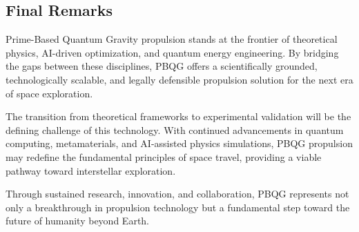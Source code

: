\documentclass{article}
\theoremstyle{plain}
\begin{document}
\subsection{Final Remarks}
\label{subsec:final_remarks}

Prime-Based Quantum Gravity propulsion stands at the frontier of theoretical physics, AI-driven optimization, and quantum energy engineering. By bridging the gaps between these disciplines, PBQG offers a scientifically grounded, technologically scalable, and legally defensible propulsion solution for the next era of space exploration.

The transition from theoretical frameworks to experimental validation will be the defining challenge of this technology. With continued advancements in quantum computing, metamaterials, and AI-assisted physics simulations, PBQG propulsion may redefine the fundamental principles of space travel, providing a viable pathway toward interstellar exploration.

Through sustained research, innovation, and collaboration, PBQG represents not only a breakthrough in propulsion technology but a fundamental step toward the future of humanity beyond Earth.

\nocite{*}


\end{document}
